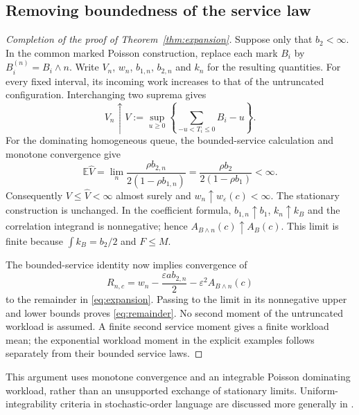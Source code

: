 \documentclass[10pt,a4paper]{amsart}
\numberwithin{equation}{section}
\newcommand{\E}{\mathbb E}
\newcommand{\1}{\mathbf 1}
\newcommand{\eps}{\varepsilon}
\begin{document}
\subsection{Removing boundedness of the service law}
\begin{proof}[Completion of the proof of Theorem~\ref{thm:expansion}]
Suppose only that $b_2<\infty$. In the common marked Poisson construction, replace each mark $B_i$ by $B_i^{(n)}=B_i\wedge n$. Write $V_n$, $w_n$, $b_{1,n}$, $b_{2,n}$ and $k_n$ for the resulting quantities. For every fixed interval, its incoming work increases to that of the untruncated configuration. Interchanging two suprema gives
\[
 V_n\uparrow V:=\sup_{u\ge0}\left\{\sum_{-u<T_i\le0}B_i-u\right\}.
\]
For the dominating homogeneous queue, the bounded-service calculation and monotone convergence give
\[
 \E\widehat V
 =\lim_n\frac{\rho b_{2,n}}{2(1-\rho b_{1,n})}
 =\frac{\rho b_2}{2(1-\rho b_1)}<\infty.
\]
Consequently $V\le\widehat V<\infty$ almost surely and $w_n\uparrow w_\eps(c)<\infty$. The stationary construction is unchanged. In the coefficient formula, $b_{1,n}\uparrow b_1$, $k_n\uparrow k_B$ and the correlation integrand is nonnegative; hence $A_{B\wedge n}(c)\uparrow A_B(c)$. This limit is finite because $\int k_B=b_2/2$ and $F\le M$.

The bounded-service identity now implies convergence of
\[
 R_{n,c}=w_n-\frac{\eps a b_{2,n}}2-\eps^2A_{B\wedge n}(c)
\]
to the remainder in \eqref{eq:expansion}. Passing to the limit in its nonnegative upper and lower bounds proves \eqref{eq:remainder}. No second moment of the untruncated workload is assumed. A finite second service moment gives a finite workload mean; the exponential workload moment in the explicit examples follows separately from their bounded service laws.
\end{proof}
This argument uses monotone convergence and an integrable Poisson dominating workload, rather than an unsupported exchange of stationary limits. Uniform-integrability criteria in stochastic-order language are discussed more generally in \cite{LV13}.
\end{document}
